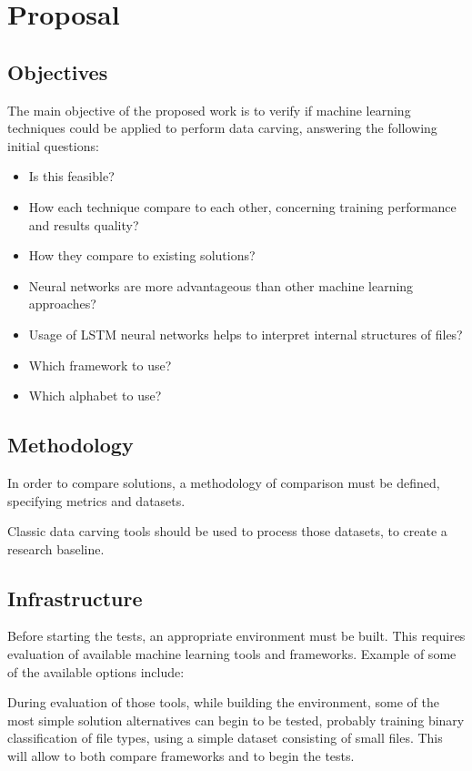 \chapter{Proposal}
\section{Objectives}
The main objective of the proposed work is to verify if machine learning techniques could be applied to perform data carving, answering the following initial questions:

\begin{itemize}
  \item Is this feasible?
  \item How each technique compare to each other, concerning training performance and results quality?
  \item How they compare to existing solutions?
  \item Neural networks are more advantageous than other machine learning approaches?
  \item Usage of LSTM neural networks helps to interpret internal structures of files?
  \item Which framework to use?
  \item Which alphabet to use?
\end{itemize}

\section{Methodology}
In order to compare solutions, a methodology of comparison must be defined, specifying metrics and datasets.


Classic data carving tools should be used to process those datasets, to create a research baseline.

\section{Infrastructure}
Before starting the tests, an appropriate environment must be built. This requires evaluation of available machine learning tools and frameworks. Example of some of the available options include:

During evaluation of those tools, while building the environment, some of the most simple solution alternatives can begin to be tested, probably training binary classification of file types, using a simple dataset consisting of small files. This will allow to both compare frameworks and to begin the tests.


